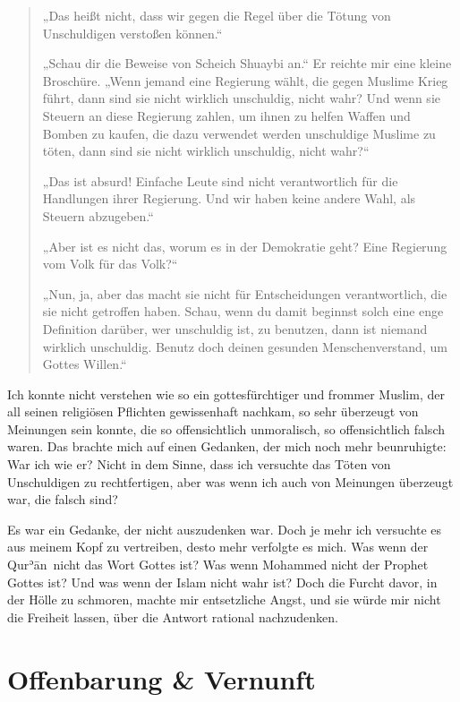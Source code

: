 \documentclass[12pt]{memoir}
\def\´{ʾ} %
\def \Quran{Qur\-\´ān} %
\begin{document}
\begin{quote}
„Das heißt nicht, dass wir gegen die Regel
über die Tötung von Unschuldigen verstoßen können.“

„Schau dir die Beweise von Scheich Shuaybi an.“
Er reichte mir eine kleine Broschüre.
„Wenn jemand eine Regierung wählt, die gegen Muslime Krieg führt,
dann sind sie nicht wirklich unschuldig, nicht wahr?
Und wenn sie Steuern an diese Regierung zahlen,
um ihnen zu helfen Waffen und Bomben zu kaufen,
die dazu verwendet werden unschuldige Muslime zu töten,
dann sind sie nicht wirklich unschuldig, nicht wahr?“

„Das ist absurd! Einfache Leute sind nicht verantwortlich
für die Handlungen ihrer Regierung.
Und wir haben keine andere Wahl, als Steuern abzugeben.“

„Aber ist es nicht das, worum es in der Demokratie geht?
Eine Regierung vom Volk für das Volk?“

„Nun, ja, aber das macht sie nicht für Entscheidungen verantwortlich,
die sie nicht getroffen haben.
Schau, wenn du damit beginnst solch eine enge Definition darüber,
wer unschuldig ist, zu benutzen, dann ist niemand wirklich unschuldig.
Benutz doch deinen gesunden Menschenverstand, um Gottes Willen.“
\end{quote}

Ich konnte nicht verstehen wie so ein gottesfürchtiger und frommer Muslim,
der all seinen religiösen Pflichten gewissenhaft nachkam,
so sehr überzeugt von Meinungen sein konnte,
die so offensichtlich unmoralisch, so offensichtlich falsch waren.
Das brachte mich auf einen Gedanken, der mich noch mehr beunruhigte:
War ich wie er?
Nicht in dem Sinne,
dass ich versuchte das Töten von Unschuldigen zu rechtfertigen,
aber was wenn ich auch von Meinungen überzeugt war, die falsch sind?

Es war ein Gedanke, der nicht auszudenken war.
Doch je mehr ich versuchte es aus meinem Kopf zu vertreiben,
desto mehr verfolgte es mich.
Was wenn der \Quran\ nicht das Wort Gottes ist?
Was wenn Mohammed nicht der Prophet Gottes ist?
Und was wenn der Islam nicht wahr ist?
Doch die Furcht davor, in der Hölle zu schmoren,
machte mir entsetzliche Angst,
und sie würde mir nicht die Freiheit lassen,
über die Antwort rational nachzudenken.


\chapter{Offenbarung \& Vernunft}
\end{document}
